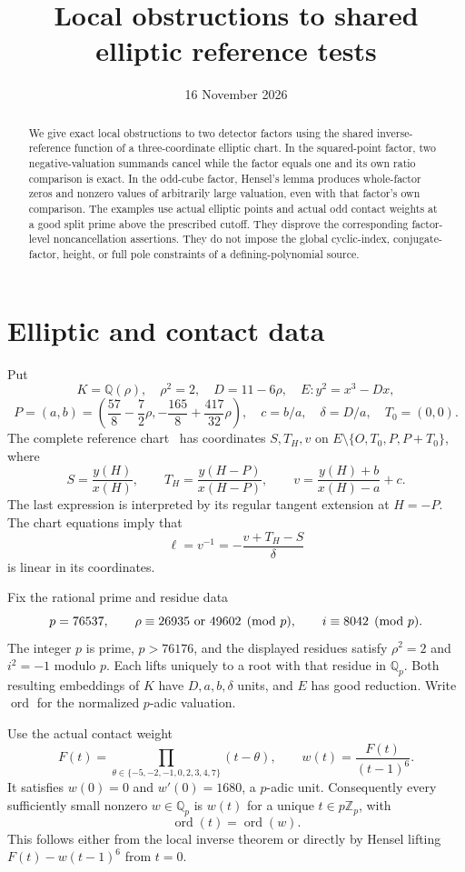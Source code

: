 \documentclass[11pt,a4paper]{article}
\title{Local obstructions to shared elliptic reference tests}
\author{}\date{16 November 2026}
\theoremstyle{remark}\newtheorem{remark}[theorem]{Remark}
\newcommand{\Q}{\mathbb Q}\newcommand{\Z}{\mathbb Z}
\begin{document}
\maketitle
\begin{abstract}
We give exact local obstructions to two detector factors using the
shared inverse-reference function of a three-coordinate elliptic chart.
In the squared-point factor, two negative-valuation summands cancel
while the factor equals one and its own ratio comparison is exact.
In the odd-cube factor, Hensel's lemma produces whole-factor zeros
and nonzero values of arbitrarily large valuation, even with that
factor's own comparison. The examples use actual elliptic points and
actual odd contact weights at a good split prime above the prescribed
cutoff. They disprove the corresponding factor-level noncancellation
assertions. They do not impose the global cyclic-index, conjugate-factor,
height, or full pole constraints of a defining-polynomial source.
\end{abstract}

\section{Elliptic and contact data}
Put
\[
 K=\Q(\rho),\quad\rho^2=2,\quad D=11-6\rho,
 \quad E:y^2=x^3-Dx,
\]
\[
 P=(a,b)=\left(\frac{57}{8}-\frac72\rho,
                     -\frac{165}{8}+\frac{417}{32}\rho\right),
 \quad c=b/a,\quad\delta=D/a,\quad T_0=(0,0).
\]
The complete reference chart~\cite{Chart} has coordinates
$S,T_H,v$ on $E\setminus\{O,T_0,P,P+T_0\}$, where
\[
 S=\frac{y(H)}{x(H)},\qquad T_H=\frac{y(H-P)}{x(H-P)},
 \qquad v=\frac{y(H)+b}{x(H)-a}+c.
\]
The last expression is interpreted by its regular tangent extension
at $H=-P$. The chart equations imply that
\[
                 \ell=v^{-1}=-\frac{v+T_H-S}{\delta}
\]
is linear in its coordinates.

Fix the rational prime and residue data
\begin{equation}\label{eq:prime}
 p=76537,\qquad \rho\equiv26935\ \hbox{or}\ 49602\pmod p,
 \qquad i\equiv8042\pmod p.
\end{equation}
The integer $p$ is prime, $p>76176$, and the displayed residues satisfy
$\rho^2=2$ and $i^2=-1$ modulo $p$. Each lifts uniquely to a root
with that residue in $\Q_p$. Both resulting embeddings of $K$
have $D,a,b,\delta$ units, and $E$ has good reduction.
Write $\operatorname{ord}$ for the normalized $p$-adic valuation.

Use the actual contact weight
\begin{equation}\label{eq:contact}
 F(t)=\prod_{\theta\in\{-5,-2,-1,0,2,3,4,7\}}(t-\theta),
 \qquad w(t)=\frac{F(t)}{(t-1)^6}.
\end{equation}
It satisfies $w(0)=0$ and $w'(0)=1680$, a $p$-adic unit.
Consequently every sufficiently small nonzero $w\in\Q_p$ is
$w(t)$ for a unique $t\in p\Z_p$, with
\begin{equation}\label{eq:contactorder}
                          \operatorname{ord}(t)=\operatorname{ord}(w).
\end{equation}
This follows either from the local inverse theorem or directly by
Hensel lifting $F(t)-w(t-1)^6$ from $t=0$.
\end{document}

